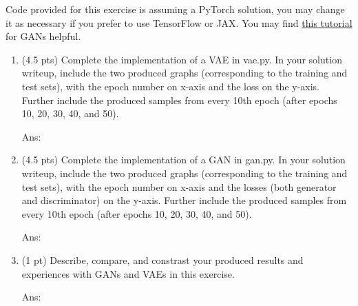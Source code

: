 \documentclass[10pt,letter,notitlepage]{article}
\newcommand{\ans}[1]{{\color{orange}\textsf{Ans}: #1}}
\newcounter{exercise}
\begin{document}
\begin{exercise}
  Code provided for this exercise is assuming a PyTorch solution, you may change it as necessary if you prefer to use TensorFlow or JAX.
  You may find \href{https://pytorch.org/tutorials/beginner/dcgan_faces_tutorial.html}{this tutorial} for GANs helpful. 
  \begin{enumerate}[label=\alph*]
    \item (4.5 pts) Complete the implementation of a VAE in vae.py. 
      In your solution writeup, include the two produced graphs (corresponding to the training and test sets), with the epoch number on x-axis and the loss on the y-axis.
      Further include the produced samples from every 10th epoch (after epochs 10, 20, 30, 40, and 50).

      \ans{} 
    \item (4.5 pts) Complete the implementation of a GAN in gan.py. 
      In your solution writeup, include the two produced graphs (corresponding to the training and test sets), with the epoch number on x-axis and the losses (both generator and discriminator) on the y-axis.
      Further include the produced samples from every 10th epoch (after epochs 10, 20, 30, 40, and 50).


      \ans{} 
    \item (1 pt) Describe, compare, and constrast your produced results and experiences with GANs and VAEs in this exercise.

      \ans{} 
  \end{enumerate}

\end{exercise}
\end{document}

